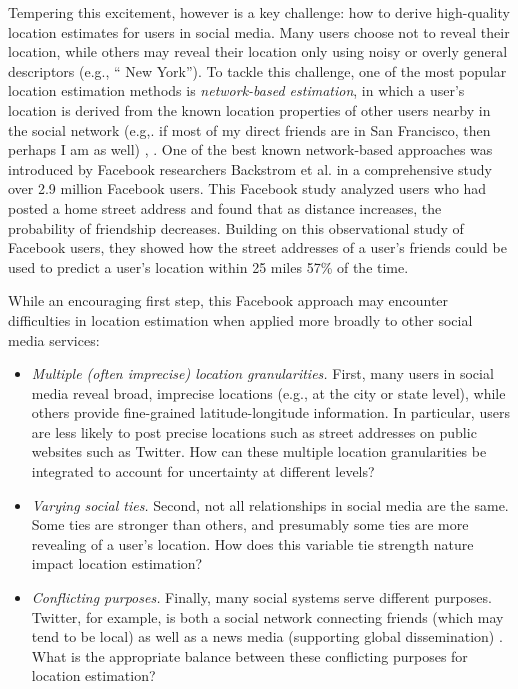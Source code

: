 
Tempering this excitement, however is a key challenge: how to derive
high-quality location estimates for users in social media.
%
Many users choose not to reveal their location, while others may reveal their
location only using noisy or overly general descriptors (e.g., `` New York'').
%
 To tackle this challenge, one of the most popular location estimation methods
 is \textit{network-based estimation}, in which a user's location is derived
 from the known location  properties of other users nearby in the social
 network (e.g,.
%
if most of my direct friends are in San Francisco, then perhaps I am as well)
\cite{davis2011infer}, \cite{li2012towards}.
%
One of the best known network-based approaches was introduced by Facebook
researchers Backstrom et al.
%
\cite{backstrom2010find} in a comprehensive study over 2.9 million Facebook
users.
%
This Facebook study analyzed users who had posted a home street address and
found that as distance increases, the probability of friendship decreases.
%
Building on this observational study of Facebook users, they showed how the
street addresses of a user's friends could be used to predict a user's location
within 25 miles 57\% of the time.

While an encouraging first step, this Facebook approach may encounter
difficulties in location estimation when applied more broadly to other social
media services:

\begin{itemize}
\item \textit{Multiple (often imprecise) location granularities.} First, many
    users in social media reveal broad, imprecise locations (e.g., at the city
    or state level), while others provide fine-grained latitude-longitude
    information.  In particular, users are less likely to post precise
    locations such as street addresses on public websites such as Twitter.  How
    can these multiple location granularities be integrated to account for
    uncertainty at different levels?
\item \textit{Varying social ties.} Second, not all relationships in social
    media are the same.  Some ties are stronger than others, and presumably
    some ties are more revealing of a user's location.  How does this variable
    tie strength nature impact location estimation?
\item \textit{Conflicting purposes.} Finally, many social systems serve
    different purposes.  Twitter, for example, is both a social network
    connecting friends (which may tend to be local) as well as a news media
    (supporting global dissemination)  \cite{kwak2010why}.  What is the
    appropriate balance between these conflicting purposes for location
    estimation?
\end{itemize}


